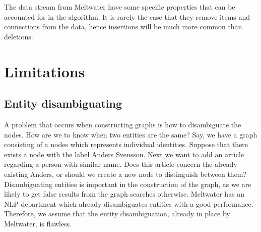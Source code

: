 The data stream from Meltwater have some specific properties that can be accounted for in the algorithm. It is rarely the case that they remove items and connections from the data, hence insertions will be much more common than deletions. 

\section{Limitations}
\subsection{Entity disambiguating}
A problem that occurs when constructing graphs is how to disambiguate the nodes. How are we to know when two entities are the same? Say, we have a graph consisting of a nodes which represents individual identities. Suppose that there exists a node with the label Anders Svensson. Next we want to add an article regarding a person with similar name. Does this article concern the already existing Anders, or should we create a new node to distinguish between them? Disambiguating entities is important in the construction of the graph, as we are likely to get false results from the graph searches otherwise. Meltwater has an NLP-department which already disambiguates entities with a good performance. Therefore, we assume that the entity disambiguation, already in place by Meltwater, is flawless. 